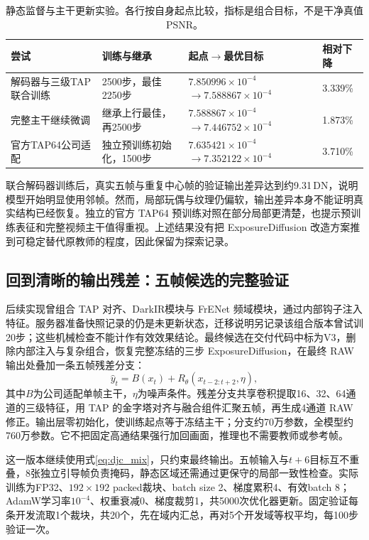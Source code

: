 \documentclass[11pt,a4paper,UTF8,fontset=fandol]{ctexart}
\newcommand{\dn}{\ensuremath{\,\mathrm{DN}}}
\begin{document}
\begin{table}[!htbp]
\centering\small
\caption{静态监督与主干更新实验。各行按自身起点比较，指标是组合目标，不是干净真值PSNR。}
\label{tab:djc_unfreeze}
\begin{tabular}{P{0.22\textwidth}P{0.23\textwidth}P{0.28\textwidth}P{0.14\textwidth}}
\toprule
尝试 & 训练与继承 & 起点$\rightarrow$最优目标 & 相对下降 \\
\midrule
解码器与三级TAP联合训练 & 2500步，最佳2250步 & $7.850996\times10^{-4}$ $\rightarrow 7.588867\times10^{-4}$ & 3.339\% \\
完整主干继续微调 & 继承上行最佳，再2500步 & $7.588867\times10^{-4}$ $\rightarrow 7.446752\times10^{-4}$ & 1.873\% \\
官方TAP64公司适配 & 独立预训练初始化，1500步 & $7.635421\times10^{-4}$ $\rightarrow 7.352122\times10^{-4}$ & 3.710\% \\
\bottomrule
\end{tabular}
\end{table}

联合解码器训练后，真实五帧与重复中心帧的验证输出差异达到约9.31\dn，说明模型开始明显使用邻帧。然而，局部玩偶与纹理仍偏软，输出差异本身不能证明真实结构已经恢复。独立的官方 TAP64 预训练对照在部分局部更清楚，也提示预训练表征和完整视频主干值得重视。上述结果没有把 ExposureDiffusion 改造方案推到可稳定替代原教师的程度，因此保留为探索记录。

\subsection{回到清晰的输出残差：五帧候选的完整验证}

后续实现曾组合 TAP 对齐、DarkIR模块与 FrENet 频域模块，通过内部钩子注入特征。服务器准备快照记录的仍是未更新状态，迁移说明另记录该组合版本曾试训20步；这些机械检查不能计作有效效果结论。最终候选在交付代码中标为V3，删除内部注入与复杂组合，恢复完整冻结的三步 ExposureDiffusion，在最终 RAW 输出处叠加一条五帧残差分支：
\begin{equation}
 \widehat y_t=B(x_t)+R_\theta(x_{t-2:t+2},\eta),
 \label{eq:djc_v3}
\end{equation}
其中$B$为公司适配单帧主干，$\eta$为噪声条件。残差分支共享卷积提取16、32、64通道的三级特征，用 TAP 的金字塔对齐与融合组件汇聚五帧，再生成4通道 RAW 修正。输出层零初始化，使训练起点等于冻结主干；分支约70万参数，全模型约760万参数。它不把固定高通结果强行加回画面，推理也不需要教师或参考帧。

这一版本继续使用式\eqref{eq:djc_mix}，只约束最终输出。五帧输入与$t+6$目标互不重叠，8张独立引导帧负责掩码，静态区域还需通过更保守的局部一致性检查。实际训练为FP32、$192\times192$ packed裁块、batch size 2、梯度累积4、有效batch 8；AdamW学习率$10^{-4}$、权重衰减0、梯度裁剪1，共5000次优化器更新。固定验证每条开发流取1个裁块，共20个，先在域内汇总，再对5个开发域等权平均，每100步验证一次。
\end{document}
